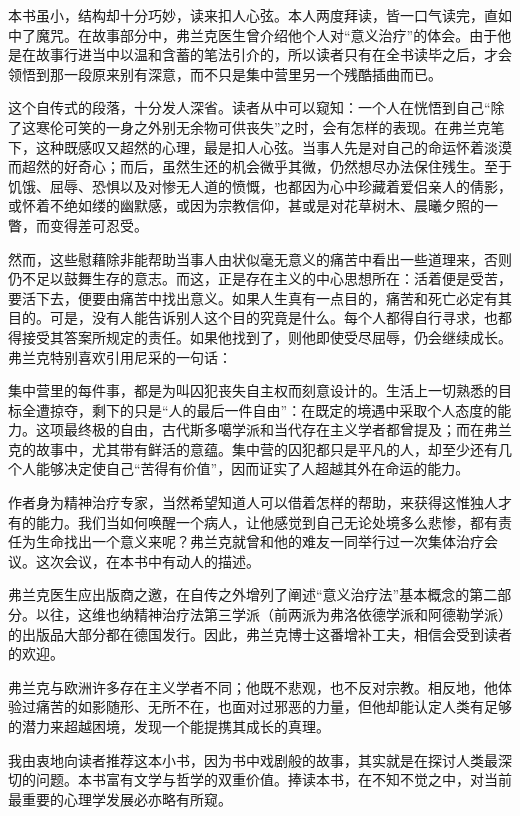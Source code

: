 \documentclass[11pt,oneside]{book}
\begin{document}
\begin{common-format}
本书虽小，结构却十分巧妙，读来扣人心弦。本人两度拜读，皆一口气读完，直如中了魔咒。在故事部分中，弗兰克医生曾介绍他个人对“意义治疗”的体会。由于他是在故事行进当中以温和含蓄的笔法引介的，所以读者只有在全书读毕之后，才会领悟到那一段原来别有深意，而不只是集中营里另一个残酷插曲而已。

这个自传式的段落，十分发人深省。读者从中可以窥知：一个人在恍悟到自己“除了这寒伦可笑的一身之外别无余物可供丧失”之时，会有怎样的表现。在弗兰克笔下，这种既感叹又超然的心理，最是扣人心弦。当事人先是对自己的命运怀着淡漠而超然的好奇心；而后，虽然生还的机会微乎其微，仍然想尽办法保住残生。至于饥饿、屈辱、恐惧以及对惨无人道的愤慨，也都因为心中珍藏着爱侣亲人的倩影，或怀着不绝如缕的幽默感，或因为宗教信仰，甚或是对花草树木、晨曦夕照的一瞥，而变得差可忍受。

然而，这些慰藉除非能帮助当事人由状似毫无意义的痛苦中看出一些道理来，否则仍不足以鼓舞生存的意志。而这，正是存在主义的中心思想所在：活着便是受苦，要活下去，便要由痛苦中找出意义。如果人生真有一点目的，痛苦和死亡必定有其目的。可是，没有人能告诉别人这个目的究竟是什么。每个人都得自行寻求，也都得接受其答案所规定的责任。如果他找到了，则他即使受尽屈辱，仍会继续成长。弗兰克特别喜欢引用尼采的一句话：

集中营里的每件事，都是为叫囚犯丧失自主权而刻意设计的。生活上一切熟悉的目标全遭掠夺，剩下的只是“人的最后一件自由”：在既定的境遇中采取个人态度的能力。这项最终极的自由，古代斯多噶学派和当代存在主义学者都曾提及；而在弗兰克的故事中，尤其带有鲜活的意蕴。集中营的囚犯都只是平凡的人，却至少还有几个人能够决定使自己“苦得有价值”，因而证实了人超越其外在命运的能力。

作者身为精神治疗专家，当然希望知道人可以借着怎样的帮助，来获得这惟独人才有的能力。我们当如何唤醒一个病人，让他感觉到自己无论处境多么悲惨，都有责任为生命找出一个意义来呢？弗兰克就曾和他的难友一同举行过一次集体治疗会议。这次会议，在本书中有动人的描述。

弗兰克医生应出版商之邀，在自传之外增列了阐述“意义治疗法”基本概念的第二部分。以往，这维也纳精神治疗法第三学派（前两派为弗洛依德学派和阿德勒学派）的出版品大部分都在德国发行。因此，弗兰克博士这番增补工夫，相信会受到读者的欢迎。

弗兰克与欧洲许多存在主义学者不同；他既不悲观，也不反对宗教。相反地，他体验过痛苦的如影随形、无所不在，也面对过邪恶的力量，但他却能认定人类有足够的潜力来超越困境，发现一个能提携其成长的真理。

我由衷地向读者推荐这本小书，因为书中戏剧般的故事，其实就是在探讨人类最深切的问题。本书富有文学与哲学的双重价值。捧读本书，在不知不觉之中，对当前最重要的心理学发展必亦略有所窥。



\end{common-format}
\end{document}
